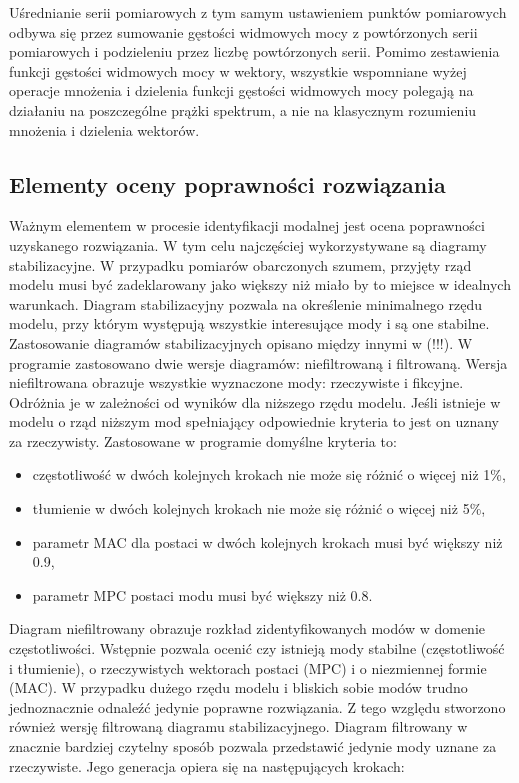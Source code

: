 Uśrednianie serii pomiarowych z tym samym ustawieniem punktów pomiarowych odbywa się przez sumowanie gęstości widmowych mocy z powtórzonych serii pomiarowych i podzieleniu przez liczbę powtórzonych serii. Pomimo zestawienia funkcji gęstości widmowych mocy w wektory, wszystkie wspomniane wyżej operacje mnożenia i dzielenia funkcji gęstości widmowych mocy polegają na działaniu na poszczególne prążki spektrum, a nie na klasycznym rozumieniu mnożenia i dzielenia wektorów. 

\subsection{Elementy oceny poprawności rozwiązania}
Ważnym elementem w procesie identyfikacji modalnej jest ocena poprawności uzyskanego rozwiązania. W tym celu najczęściej wykorzystywane są diagramy stabilizacyjne. W przypadku pomiarów obarczonych szumem, przyjęty rząd modelu musi być zadeklarowany jako większy niż miało by to miejsce w idealnych warunkach. Diagram stabilizacyjny pozwala na określenie minimalnego rzędu modelu, przy którym występują wszystkie interesujące mody i są one stabilne. Zastosowanie diagramów stabilizacyjnych opisano między innymi w (!!!). W programie zastosowano dwie wersje diagramów: niefiltrowaną i filtrowaną. Wersja niefiltrowana obrazuje wszystkie wyznaczone mody: rzeczywiste i fikcyjne. Odróżnia je w zależności od wyników dla niższego rzędu modelu. Jeśli istnieje w modelu o rząd niższym mod spełniający odpowiednie kryteria to jest on uznany za rzeczywisty. Zastosowane w programie domyślne kryteria to:
\begin{itemize}
	\item częstotliwość w dwóch kolejnych krokach nie może się różnić o więcej niż 1\%,
	\item tłumienie w dwóch kolejnych krokach nie może się różnić o więcej niż 5\%,
	\item parametr MAC dla postaci w dwóch kolejnych krokach musi być większy niż 0.9,
	\item parametr MPC postaci modu musi być większy niż 0.8.
\end{itemize}
Diagram niefiltrowany obrazuje rozkład zidentyfikowanych modów w domenie częstotliwości. Wstępnie pozwala ocenić czy istnieją mody stabilne (częstotliwość i tłumienie), o rzeczywistych wektorach postaci (MPC) i o niezmiennej formie (MAC). W przypadku dużego rzędu modelu i bliskich sobie modów trudno jednoznacznie odnaleźć jedynie poprawne rozwiązania. Z tego względu stworzono również wersję filtrowaną diagramu stabilizacyjnego. Diagram filtrowany w znacznie bardziej czytelny sposób pozwala przedstawić jedynie mody uznane za rzeczywiste. Jego generacja opiera się na następujących krokach:
